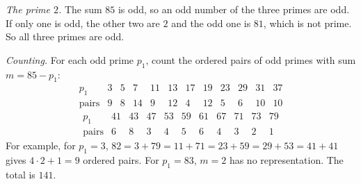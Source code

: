 \emph{The prime $2$.} The sum $85$ is odd, so an odd number of the three primes are odd. If only one is odd, the other two are $2$ and the odd one is $81$, which is not prime. So all three primes are odd.

\emph{Counting.} For each odd prime $p_1$, count the ordered pairs of odd primes with sum $m=85-p_1$:
\[\begin{array}{c|ccccccccccc}
p_1&3&5&7&11&13&17&19&23&29&31&37\\\hline
\text{pairs}&9&8&14&9&12&4&12&5&6&10&10
\end{array}\]
\[\begin{array}{c|cccccccccc}
p_1&41&43&47&53&59&61&67&71&73&79\\\hline
\text{pairs}&6&8&3&4&5&6&4&3&2&1
\end{array}\]
For example, for $p_1=3$, $82=3+79=11+71=23+59=29+53=41+41$ gives $4\cdot2+1=9$ ordered pairs. For $p_1=83$, $m=2$ has no representation. The total is $\boxed{141}$.
